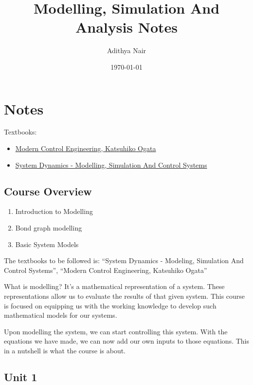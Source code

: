 \documentclass[11pt]{report}
\author{Adithya Nair}
\date{\today}
\title{Modelling, Simulation And Analysis Notes}
\begin{document}
\maketitle
\tableofcontents

\part{Notes}
\label{sec:org0ab5aef}
Textbooks:
\begin{itemize}
\item \href{file:///home/adithya/University-Latex-Notes/Modelling, Simulation And Analysis/textbooks/Katsuhiko Ogata - Modern Control Engineering-Prentice Hal (2010).pdf}{Modern Control Engineering, Katsuhiko Ogata}
\item \href{file:///home/adithya/University-Latex-Notes/Modelling, Simulation And Analysis/textbooks/Dean C. Karnopp, Donald L. Margolis, Ronald C. Rosenberg(auth.) - System Dynamics\_ Modeling, Simulation, and Control of Mechatronic Systems, Fifth Edition (2012).pdf}{System Dynamics - Modelling, Simulation And Control Systems}
\end{itemize}
\chapter{Course Overview}
\label{sec:org3be10cd}
\begin{enumerate}
\item Introduction to Modelling
\item Bond graph modelling
\item Basic System Models
\end{enumerate}

The textbooks to be followed is: ``System Dynamics - Modeling, Simulation And Control Systems'', ``Modern Control Engineering, Katsuhiko Ogata''

What is modelling? It's a mathematical representation of a system. These representations allow us to evaluate the results of that given system. This course is focused on equipping us with the working knowledge to develop such mathematical models for our systems.

Upon modelling the system, we can start controlling this system. With the equations we have made, we can now add our own inputs to those equations. This in a nutshell is what the course is about.
\chapter{Unit 1}
\label{sec:orgcfb0727}
\end{document}
